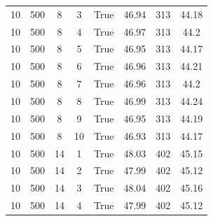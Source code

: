 \begin{table}[H]
{\begin{tabular}{cccccccc}
			10            & 500                             & 8                        & 3            & True             & 46.94                  & 313           & 44.18             \\
			10            & 500                             & 8                        & 4            & True             & 46.97                  & 313           & 44.2              \\
			10            & 500                             & 8                        & 5            & True             & 46.95                  & 313           & 44.17             \\
			10            & 500                             & 8                        & 6            & True             & 46.96                  & 313           & 44.21             \\
			10            & 500                             & 8                        & 7            & True             & 46.96                  & 313           & 44.2              \\
			10            & 500                             & 8                        & 8            & True             & 46.99                  & 313           & 44.24             \\
			10            & 500                             & 8                        & 9            & True             & 46.95                  & 313           & 44.19             \\
			10            & 500                             & 8                        & 10           & True             & 46.93                  & 313           & 44.17             \\
			\midrule
			10            & 500                             & 14                       & 1            & True             & 48.03                  & 402           & 45.15             \\
			10            & 500                             & 14                       & 2            & True             & 47.99                  & 402           & 45.12             \\
			10            & 500                             & 14                       & 3            & True             & 48.04                  & 402           & 45.16             \\
			10            & 500                             & 14                       & 4            & True             & 47.99                  & 402           & 45.12             \\

\end{tabular}}
\end{table}
